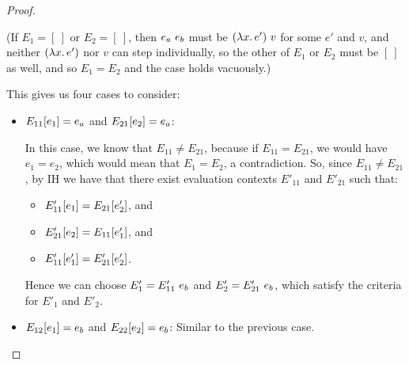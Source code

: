 \begin{proof}
\begin{itemize}
      (If $E_1 = [~]$ or $E_2 = [~]$, then $e_a~e_b$ must be
      $(\lambda x.\,e')~v$ for some $e'$ and $v$, and neither
      $(\lambda x.\,e')$ nor $v$ can step individually, so the other of
      $E_1$ or $E_2$ must be $[~]$ as well, and so $E_1 = E_2$ and the
      case holds vacuously.)

      This gives us four cases to consider:

      \begin{itemize}
        \item $E_{11}\hspace{-0.5mm}\left[e_1\right] = e_a$ and
          $E_{21}\hspace{-0.5mm}\left[e_2\right] = e_a$:

          In this case, we know that $E_{11} \neq E_{21}$, because if
          $E_{11} = E_{21}$, we would have $e_1 = e_2$, which would
          mean that $E_1 = E_2$, a contradiction.  So, since $E_{11}
          \neq E_{21}$, by IH we have that there exist evaluation
          contexts $E'_{11}$ and $E'_{21}$ such that:
          \begin{itemize}
          \item $E'_{11}\hspace{-0.5mm}\left[e_1\right] = E_{21}\hspace{-0.5mm}\left[e'_2\right]$, and
          \item $E'_{21}\hspace{-0.5mm}\left[e_2\right] = E_{11}\hspace{-0.5mm}\left[e'_1\right]$, and
          \item $E'_{11}\hspace{-0.5mm}\left[e'_1\right] = E'_{21}\hspace{-0.5mm}\left[e'_2\right]$.
          \end{itemize}

          Hence we can choose $E'_1 = E'_{11}~e_b$ and $E'_2 =
          E'_{21}~e_b$, which satisfy the criteria for $E'_1$
          and $E'_2$.


        \item $E_{12}\hspace{-0.5mm}\left[e_1\right] = e_b$ and
          $E_{22}\hspace{-0.5mm}\left[e_2\right] = e_b$: Similar to the previous
          case.
          

\end{itemize}
\end{itemize}
\end{proof}
